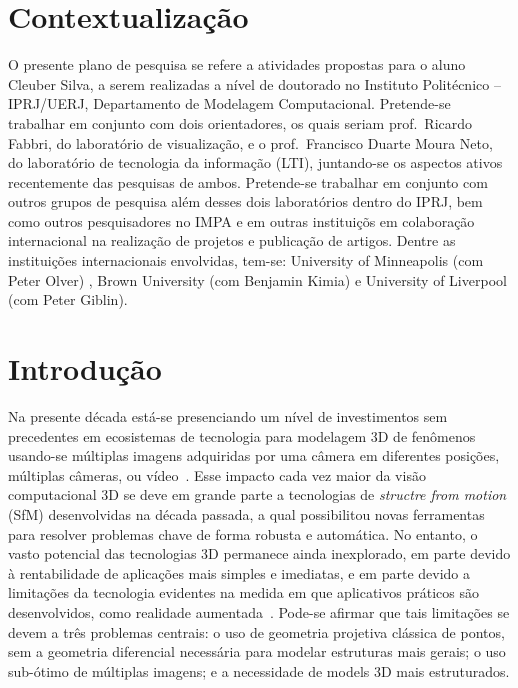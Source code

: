 \documentclass[a4paper,titlepage]{article}
\begin{document}


%


\section{Contextualização}

O presente plano de pesquisa se refere a atividades propostas para o aluno
Cleuber Silva, a serem realizadas a nível de doutorado no Instituto
Politécnico -- IPRJ/UERJ, Departamento de Modelagem Computacional.
Pretende-se trabalhar em conjunto com dois orientadores, os quais seriam prof.\
Ricardo Fabbri, do laboratório de visualização, e o prof.\ Francisco Duarte
Moura Neto, do laboratório de tecnologia da informação (LTI), juntando-se os
aspectos ativos recentemente das pesquisas de ambos. Pretende-se trabalhar em
conjunto com outros grupos de pesquisa além desses dois laboratórios dentro do
IPRJ, bem como outros pesquisadores no IMPA e em outras instituiçõs em
colaboração internacional na realização de projetos e publicação de artigos.
Dentre as instituições internacionais envolvidas, tem-se: University of
Minneapolis (com Peter Olver) , Brown University (com Benjamin Kimia) e
University of Liverpool (com Peter Giblin).

\section{Introdução}


Na presente década está-se presenciando um nível de investimentos sem
precedentes em ecosistemas de tecnologia para modelagem 3D de fenômenos
usando-se múltiplas imagens adquiridas por uma câmera em diferentes posições,
múltiplas câmeras, ou vídeo~\cite{AppleKeynote:2018}. %
Esse impacto cada vez maior da visão computacional 3D se deve em grande parte a
tecnologias de \emph{structre from motion} (SfM) desenvolvidas na década
passada, a qual possibilitou novas ferramentas para resolver problemas chave de
forma robusta e automática. No entanto, o vasto potencial das tecnologias 3D
permanece ainda inexplorado, em parte devido à rentabilidade de aplicações mais
simples e imediatas, e em parte devido a limitações da tecnologia evidentes
na medida em que aplicativos práticos são desenvolvidos, como realidade
aumentada~\cite{AppleKeynote:2018}. Pode-se afirmar que tais limitações se devem
a três problemas centrais: o uso de geometria projetiva clássica de pontos, sem 
a geometria diferencial necessária para modelar estruturas mais gerais; o uso
sub-ótimo de múltiplas imagens; e a necessidade de models 3D mais
estruturados.
\end{document}

